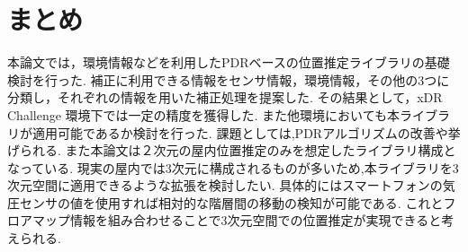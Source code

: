 

\section{まとめ}
本論文では，環境情報などを利用したPDRベースの位置推定ライブラリの基礎検討を行った.
補正に利用できる情報をセンサ情報，環境情報，その他の3つに分類し，それぞれの情報を用いた補正処理を提案した.
その結果として，xDR Challenge 環境下では一定の精度を獲得した.
また他環境においても本ライブラリが適用可能であるか検討を行った.
課題としては,PDRアルゴリズムの改善や挙げられる.
また本論文は２次元の屋内位置推定のみを想定したライブラリ構成となっている.
現実の屋内では3次元に構成されるものが多いため,本ライブラリを3次元空間に適用できるような拡張を検討したい.
具体的にはスマートフォンの気圧センサの値を使用すれば相対的な階層間の移動の検知が可能である.
これとフロアマップ情報を組み合わせることで3次元空間での位置推定が実現できると考えられる.


